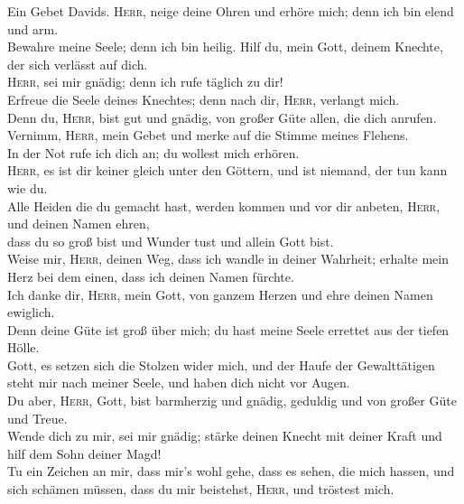  Ein Gebet Davids. \textsc{Herr}, neige deine Ohren und
erhöre mich; denn ich bin elend und arm.\\
 Bewahre meine Seele; denn ich bin heilig. Hilf du, mein
Gott, deinem Knechte, der sich verlässt auf dich.\\
 \textsc{Herr}, sei mir gnädig; denn ich rufe täglich zu
dir!\\
 Erfreue die Seele deines Knechtes; denn nach dir,
\textsc{Herr}, verlangt mich.\\
 Denn du, \textsc{Herr}, bist gut und gnädig, von großer
Güte allen, die dich anrufen.\\
 Vernimm, \textsc{Herr}, mein Gebet und merke auf die
Stimme meines Flehens.\\
 In der Not rufe ich dich an; du wollest mich erhören.\\
 \textsc{Herr}, es ist dir keiner gleich unter den
Göttern, und ist niemand, der tun kann wie du.\\
 Alle Heiden die du gemacht hast, werden kommen und vor
dir anbeten, \textsc{Herr}, und deinen Namen ehren,\\
 dass du so groß bist und Wunder tust und allein Gott
bist.\\
 Weise mir, \textsc{Herr}, deinen Weg, dass ich wandle in
deiner Wahrheit; erhalte mein Herz bei dem einen, dass ich deinen Namen
fürchte.\\
 Ich danke dir, \textsc{Herr}, mein Gott, von ganzem
Herzen und ehre deinen Namen ewiglich.\\
 Denn deine Güte ist groß über mich; du hast meine Seele
errettet aus der tiefen Hölle.\\
 Gott, es setzen sich die Stolzen wider mich, und der
Haufe der Gewalttätigen steht mir nach meiner Seele, und haben dich
nicht vor Augen.\\
 Du aber, \textsc{Herr}, Gott, bist barmherzig und
gnädig, geduldig und von großer Güte und Treue.\\
 Wende dich zu mir, sei mir gnädig; stärke deinen Knecht
mit deiner Kraft und hilf dem Sohn deiner Magd!\\
 Tu ein Zeichen an mir, dass mir's wohl gehe, dass es
sehen, die mich hassen, und sich schämen müssen, dass du mir beistehst,
\textsc{Herr}, und tröstest mich.

